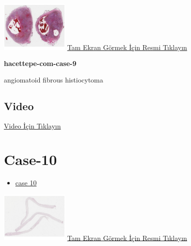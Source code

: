 \documentclass[
  letterpaper,
  DIV=11,
  numbers=noendperiod]{scrreprt}
\providecommand{\tightlist}{%
  \setlength{\itemsep}{0pt}\setlength{\parskip}{0pt}}\usepackage{longtable,booktabs,array}
\begin{document}
\href{https://images.patolojiatlasi.com/hacettepe-com-case-9/HE.html}{\includegraphics[width=0.25\textwidth,height=\textheight]{./screenshots/hacettepe-com-case-9_screenshot.png}}
\href{https://images.patolojiatlasi.com/hacettepe-com-case-9/HE.html}{Tam
Ekran Görmek İçin Resmi Tıklayın}

\textbf{hacettepe-com-case-9}

\begin{tcolorbox}[enhanced jigsaw, left=2mm, toprule=.15mm, rightrule=.15mm, bottomrule=.15mm, leftrule=.75mm, colback=white, colframe=quarto-callout-tip-color-frame, toptitle=1mm, breakable, titlerule=0mm, colbacktitle=quarto-callout-tip-color!10!white, bottomtitle=1mm, title=\textcolor{quarto-callout-tip-color}{\faLightbulb}\hspace{0.5em}{Tanı}, arc=.35mm, opacitybacktitle=0.6, opacityback=0, coltitle=black]

angiomatoid fibrous histiocytoma

\end{tcolorbox}

\hypertarget{video-7}{%
\subsection{Video}\label{video-7}}

\href{https://www.youtube.com/watch?v=9OxpsDNCHWk}{Video İçin Tıklayın}

\hypertarget{sec-hacettepe-case-of-the-month-case-10}{%
\section{Case-10}\label{sec-hacettepe-case-of-the-month-case-10}}

\begin{itemize}
\tightlist
\item
  \href{https://www.youtube.com/watch?v=0vNcCaTYstU\&ab_channel=KemalKosemehmetoglu}{case
  10}
\end{itemize}

\href{https://images.patolojiatlasi.com/hacettepe-com-case-10/HE.html}{\includegraphics[width=0.25\textwidth,height=\textheight]{./screenshots/hacettepe-com-case-10_screenshot.png}}
\href{https://images.patolojiatlasi.com/hacettepe-com-case-10/HE.html}{Tam
Ekran Görmek İçin Resmi Tıklayın}
\end{document}
